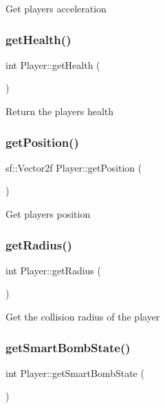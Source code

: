 Get player\textquotesingle{}s acceleration \mbox{\label{class_player_abcb15d249bed9a4ab0ab86b52b0d747a}} 
\subsubsection{\texorpdfstring{get\+Health()}{getHealth()}}
{\footnotesize\ttfamily int Player\+::get\+Health (\begin{DoxyParamCaption}{ }\end{DoxyParamCaption})}

Return the player\textquotesingle{}s health \mbox{\label{class_player_a23356f99a9de86d3d47eadb679b332dc}} 
\subsubsection{\texorpdfstring{get\+Position()}{getPosition()}}
{\footnotesize\ttfamily sf\+::\+Vector2f Player\+::get\+Position (\begin{DoxyParamCaption}{ }\end{DoxyParamCaption})}

Get player\textquotesingle{}s position \mbox{\label{class_player_a96b2c2aa27ba5d756b12fddb2a841cc8}} 
\subsubsection{\texorpdfstring{get\+Radius()}{getRadius()}}
{\footnotesize\ttfamily int Player\+::get\+Radius (\begin{DoxyParamCaption}{ }\end{DoxyParamCaption})}

Get the collision radius of the player \mbox{\label{class_player_a5aaef7be6b70ec6069a861add36b5e2c}} 
\subsubsection{\texorpdfstring{get\+Smart\+Bomb\+State()}{getSmartBombState()}}
{\footnotesize\ttfamily int Player\+::get\+Smart\+Bomb\+State (\begin{DoxyParamCaption}{ }\end{DoxyParamCaption})}

